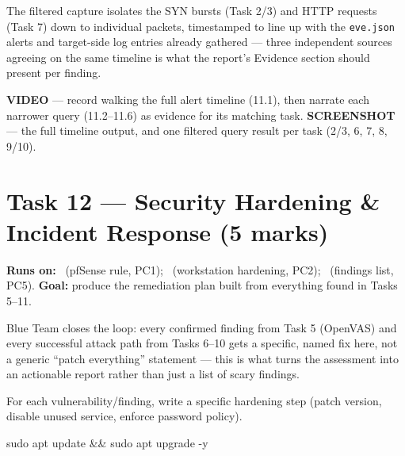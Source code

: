\documentclass[11pt,a4paper]{article}
\begin{document}
\begin{expectbox}
The filtered capture isolates the SYN bursts (Task 2/3) and HTTP requests (Task 7)
down to individual packets, timestamped to line up with the \texttt{eve.json} alerts
and target-side log entries already gathered --- three independent sources agreeing on
the same timeline is what the report's Evidence section should present per finding.
\end{expectbox}

\begin{notebox}
\textbf{VIDEO} --- record walking the full alert timeline (11.1), then narrate each
narrower query (11.2--11.6) as evidence for its matching task. \textbf{SCREENSHOT} ---
the full timeline output, and one filtered query result per task (2/3, 6, 7, 8, 9/10).
\end{notebox}

\clearpage

\section{Task 12 --- Security Hardening \& Incident Response (5 marks)}
\textbf{Runs on:} \marshall\ (pfSense rule, PC1); \fahdil\ (workstation hardening,
PC2); \amina\ (findings list, PC5). \quad\textbf{Goal:} produce the remediation plan
built from everything found in Tasks 5--11.

\begin{bluebox}
Blue Team closes the loop: every confirmed finding from Task 5 (OpenVAS) and every
successful attack path from Tasks 6--10 gets a specific, named fix here, not a generic
``patch everything'' statement --- this is what turns the assessment into an
actionable report rather than just a list of scary findings.
\end{bluebox}

\begin{steps}
\item For each vulnerability/finding, write a specific hardening step (patch version,
  disable unused service, enforce password policy).
\end{steps}

\begin{cmdbox}
\begin{cmdverb}
sudo apt update && sudo apt upgrade -y
\end{cmdverb}
\end{cmdbox}
\end{document}
